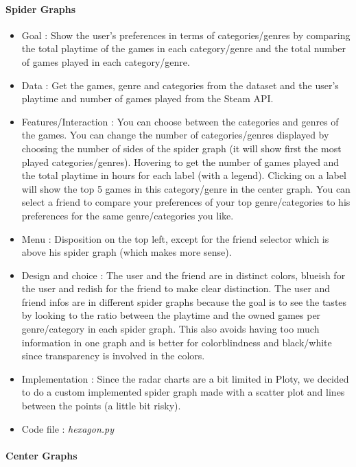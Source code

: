 \documentclass{article}
\begin{document}
	\paragraph{Spider Graphs}
	
	\begin{itemize}
		\item Goal : Show the user's preferences in terms of categories/genres by comparing the total playtime of the games in each category/genre and the total number of games played in each category/genre.
		\item Data : Get the games, genre and categories from the dataset and the user's playtime and number of games played from the Steam API.
		\item Features/Interaction : You can choose between the categories and genres of the games. You can change the number of categories/genres displayed by choosing the number of sides of the spider graph (it will show first the most played categories/genres). Hovering to get the number of games played and the total playtime in hours for each label (with a legend). Clicking on a label will show the top 5 games in this category/genre in the center graph. You can select a friend to compare your preferences of your top genre/categories to his preferences for the same genre/categories you like.
		\item Menu : Disposition on the top left, except for the friend selector which is above his spider graph (which makes more sense).
		\item Design and choice : The user and the friend are in distinct colors, blueish for the user and redish for the friend to make clear distinction. The user and friend infos are in different spider graphs because the goal is to see the tastes by looking to the ratio between the playtime and the owned games per genre/category in each spider graph. This also avoids having too much information in one graph and is better for colorblindness and black/white since transparency is involved in the colors.
		\item Implementation : Since the radar charts are a bit limited in Ploty, we decided to do a custom implemented spider graph made with a scatter plot and lines between the points (a little bit risky).
		\item Code file : \textit{hexagon.py}
	\end{itemize}

	\paragraph{Center Graphs}
	
\end{document}
